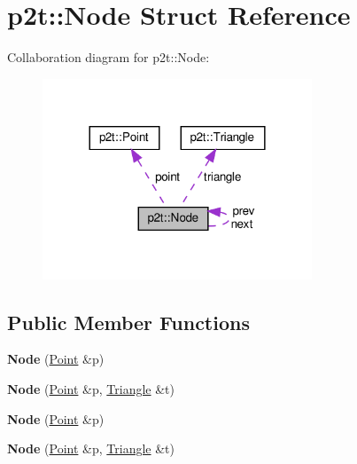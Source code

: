\hypertarget{structp2t_1_1Node}{}\section{p2t\+:\+:Node Struct Reference}
\label{structp2t_1_1Node}


Collaboration diagram for p2t\+:\+:Node\+:
\nopagebreak
\begin{figure}[H]
\begin{center}
\leavevmode
\includegraphics[width=228pt]{structp2t_1_1Node__coll__graph}
\end{center}
\end{figure}
\subsection*{Public Member Functions}
\begin{DoxyCompactItemize}
\item 
\mbox{\label{structp2t_1_1Node_a552fce8408e77734916d24f49a2554ee}} 
{\bfseries Node} (\hyperlink{structp2t_1_1Point}{Point} \&p)
\item 
\mbox{\label{structp2t_1_1Node_ae8a123fb34395a84c2c3909240650119}} 
{\bfseries Node} (\hyperlink{structp2t_1_1Point}{Point} \&p, \hyperlink{classp2t_1_1Triangle}{Triangle} \&t)
\item 
\mbox{\label{structp2t_1_1Node_a552fce8408e77734916d24f49a2554ee}} 
{\bfseries Node} (\hyperlink{structp2t_1_1Point}{Point} \&p)
\item 
\mbox{\label{structp2t_1_1Node_ae8a123fb34395a84c2c3909240650119}} 
{\bfseries Node} (\hyperlink{structp2t_1_1Point}{Point} \&p, \hyperlink{classp2t_1_1Triangle}{Triangle} \&t)
\end{DoxyCompactItemize}
